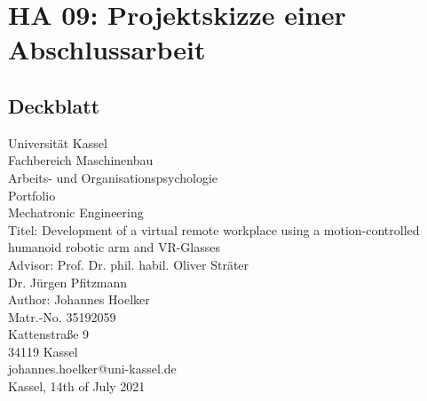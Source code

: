\chapter{HA 09: Projektskizze einer Abschlussarbeit}
\section{Deckblatt}
\begin{center}
Universität Kassel\\
Fachbereich Maschinenbau\\
Arbeits- und Organisationspsychologie\\
Portfolio\\
Mechatronic Engineering\\
Titel: Development of a virtual remote workplace using a motion-controlled humanoid robotic arm and VR-Glasses\\
Advisor: Prof. Dr. phil. habil. Oliver Sträter\\
Dr. Jürgen Pfitzmann\\
Author: Johannes Hoelker\\
Matr.-No. 35192059\\
Kattenstraße 9\\
34119 Kassel\\
johannes.hoelker@uni-kassel.de\\
Kassel, 14th of July 2021
\end{center}
